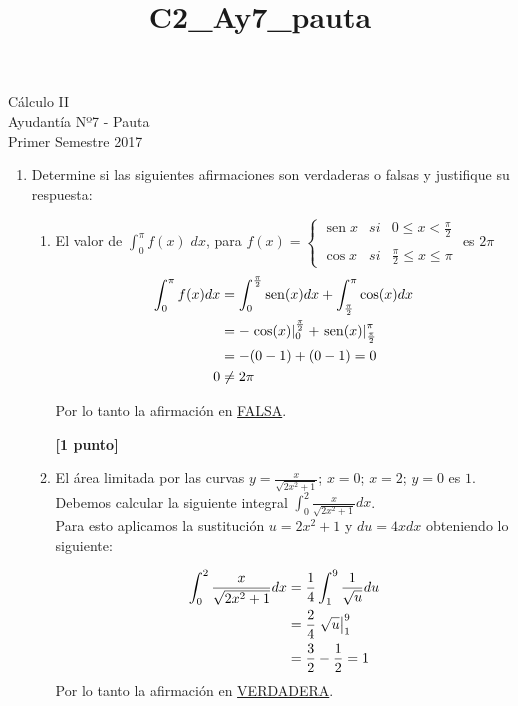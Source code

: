 \documentclass[letterpaper,10pt]{article}
\title{C2_Ay7_pauta}
\newcommand{\dis}{\displaystyle}
\def\sin{\operatorname{sen}}
\begin{document}
\begin{center}
Cálculo II\\
Ayudantía Nº7 - Pauta\\
Primer Semestre 2017
\end{center}

\begin{enumerate}
\item Determine si las siguientes afirmaciones son verdaderas o falsas y justifique su respuesta:

\begin{enumerate}[label=\emph{\alph*)}]

\item El valor de $\displaystyle \int_0^\pi f(x) \; dx$, para $f(x)= \left\{ \begin{array}{lcc}
             \sin x &   si  & 0 \leq x < \frac{\pi}{2} \\
             \\ \cos x &  si & \frac{\pi}{2} \leq x \leq \pi 
             \end{array}
   \right.$ es $2\pi$\\


\begin{align*}
\dis \int_0^\pi f(x)dx &= \int_0^\frac{\pi}{2} \sin (x)dx +\int_\frac{\pi}{2}^\pi \cos(x)dx\\
\dis  &=  -\displaystyle  \left.\cos(x)\right|_{0}^{\frac{\pi}{2}} + \displaystyle  \left.\sin(x)\right|_{\frac{\pi}{2}}^{\pi}\\
\dis  &= -(0-1) + (0-1)=0\\ 
\dis 0 &\neq	2\pi
\end{align*}

Por lo tanto la afirmación en \underline{FALSA}.

\dotfill\textbf{[1 punto]}

\item El área limitada por las curvas $y = \frac{x}{\sqrt{2x^2+1}}$; $x=0$; $x=2$; $y=0$ es $1$.\\

Debemos calcular la siguiente integral $\dis \int_0^2 \frac{x}{\sqrt{2x^2+1}}dx$.\\

Para esto aplicamos la sustitución $u=2x^2+1$ y $du=4xdx$ obteniendo lo siguiente:

\begin{align*}
\dis \int_0^2 \frac{x}{\sqrt{2x^2+1}}dx &= \frac{1}{4}\int_1^9 \frac{1}{\sqrt{u}}du\\
\dis  &= \displaystyle  \frac{2}{4} \left.\sqrt{u}\right|_{1}^{9}\\
\dis  &= \frac{3}{2}- \frac{1}{2} = 1\\
\end{align*}
Por lo tanto la afirmación en \underline{VERDADERA}.


\end{enumerate}
\end{enumerate}
\end{document}

